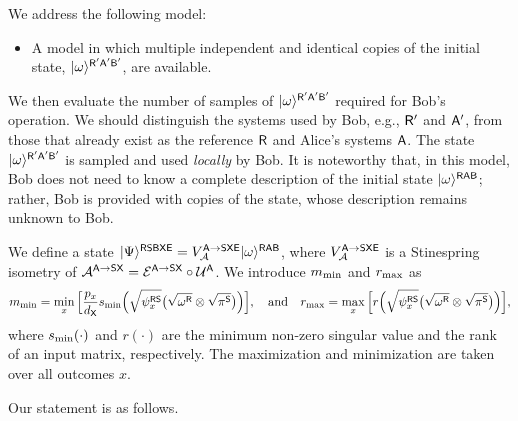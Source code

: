 We address the following model: 
\begin{itemize}
    \item A model in which multiple independent and identical copies of the initial state, $|\omega\rangle^{{\mathsf{R}}'{\mathsf{A}}'{\mathsf{B}}'}$, are available.
\end{itemize}
We then evaluate the number of samples of $|\omega\rangle^{{\mathsf{R}}'{\mathsf{A}}'{\mathsf{B}}'}$ required for Bob's operation.
We should distinguish the systems used by Bob, e.g., ${\mathsf{R}}'$ and ${\mathsf{A}}'$, from those that already exist as the reference ${\mathsf{R}}$ and Alice's systems ${\mathsf{A}}$.
The state $|\omega\rangle^{{\mathsf{R}}'{\mathsf{A}}'{\mathsf{B}}'}$ is sampled and used \emph{locally} by Bob.
It is noteworthy that, in this model, Bob does not need to know a complete description of the initial state $|\omega\rangle^{{\mathsf{R}}{\mathsf{A}}{\mathsf{B}}}$; rather, Bob is provided with copies of the state, whose description remains unknown to Bob.




We define a state $|\Psi\rangle^{{\mathsf{R}}{\mathsf{S}}{\mathsf{B}}{\mathsf{X}}{\mathsf{E}}} = V_{\mathcal{A}}^{{\mathsf{A}}\rightarrow{\mathsf{S}}{\mathsf{X}}{\mathsf{E}}}|\omega\rangle^{{\mathsf{R}}{\mathsf{A}}{\mathsf{B}}}$, where $V_{\mathcal{A}}^{{\mathsf{A}}\rightarrow{\mathsf{S}}{\mathsf{X}}{\mathsf{E}}}$ is a Stinespring isometry of ${\mathcal{A}}^{{\mathsf{A}}\rightarrow{\mathsf{S}}{\mathsf{X}}} = {\mathcal{E}}^{{\mathsf{A}}\rightarrow{\mathsf{S}}{\mathsf{X}}}\circ {\mathcal{U}}^{\mathsf{A}}$. 
We introduce $m_{\rm min}$ and $r_{\rm max}$ as  
\begin{align}
    \label{inteq:142}
    m_{\rm min} = \min_x\Big[\frac{p_x}{d_{\mathsf{X}}}s_{\rm min}\Big(\sqrt{\psi_x^{{\mathsf{R}}{\mathsf{S}}}}\big(\sqrt{\omega^{\mathsf{R}}}\otimes\sqrt{\pi^{\mathsf{S}}}\big)\Big)\Big], \ \ \ \text{and} \ \ \ r_{\rm max} = \max_x\Big[r\Big(\sqrt{\psi_x^{{\mathsf{R}}{\mathsf{S}}}}\big(\sqrt{\omega^{\mathsf{R}}}\otimes\sqrt{\pi^{\mathsf{S}}}\big)\Big)\Big],
\end{align}
where $s_{\rm min}(\cdot)$ and $r(\cdot)$ are the minimum non-zero singular value and the rank of an input matrix, respectively.
The maximization and minimization are taken over all outcomes $x$.


Our statement is as follows. 

